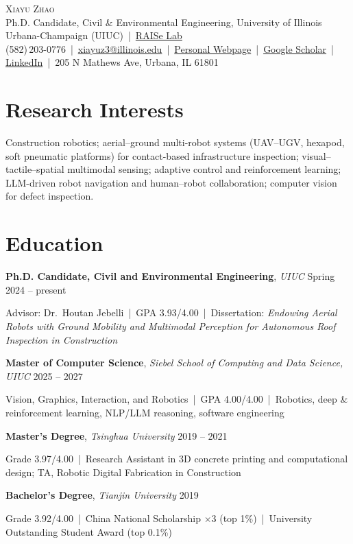 \documentclass[10pt,a4paper]{article}
\newcommand{\entry}[3]{\textbf{#1}, \textit{#2} \hfill #3\par}
\begin{document}
\small

\begin{center}
    {\Large\textsc{Xiayu Zhao}}\\[1pt]
    Ph.D. Candidate, Civil \& Environmental Engineering, University of Illinois Urbana-Champaign (UIUC) \,|\, \href{https://raiselab.cee.illinois.edu/}{RAISe Lab}\\
    (582)\,203-0776 \,|\, \href{mailto:xiayuz3@illinois.edu}{xiayuz3@illinois.edu} \,|\, \href{https://xiayu-zhao.github.io/}{Personal Webpage} \,|\, \href{https://scholar.google.com/citations?user=a1trBDoAAAAJ&hl=en}{Google Scholar} \,|\, \href{https://www.linkedin.com/in/xiayuzhao}{LinkedIn} \,|\, 205 N Mathews Ave, Urbana, IL 61801
\end{center}
\vspace{-6pt}

\section{Research Interests}
Construction robotics; aerial--ground multi-robot systems (UAV--UGV, hexapod, soft pneumatic platforms) for contact-based infrastructure inspection; visual--tactile--spatial multimodal sensing; adaptive control and reinforcement learning; LLM-driven robot navigation and human--robot collaboration; computer vision for defect inspection.

\section{Education}
\entry{Ph.D. Candidate, Civil and Environmental Engineering}{UIUC}{Spring 2024 -- present}
\quad Advisor: Dr.\ Houtan Jebelli \,|\, GPA 3.93/4.00 \,|\, Dissertation: \textit{Endowing Aerial Robots with Ground Mobility and Multimodal Perception for Autonomous Roof Inspection in Construction}\par
\entry{Master of Computer Science}{Siebel School of Computing and Data Science, UIUC}{2025 -- 2027}
\quad Vision, Graphics, Interaction, and Robotics \,|\, GPA 4.00/4.00 \,|\, Robotics, deep \& reinforcement learning, NLP/LLM reasoning, software engineering\par
\entry{Master's Degree}{Tsinghua University}{2019 -- 2021}
\quad Grade 3.97/4.00 \,|\, Research Assistant in 3D concrete printing and computational design; TA, Robotic Digital Fabrication in Construction\par
\entry{Bachelor's Degree}{Tianjin University}{2019}
\quad Grade 3.92/4.00 \,|\, China National Scholarship $\times$3 (top 1\%) \,|\, University Outstanding Student Award (top 0.1\%)\par
\end{document}
